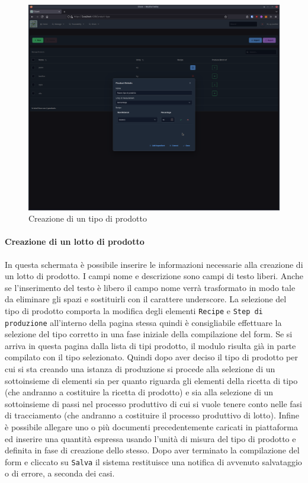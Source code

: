 \documentclass[a4paper,11pt]{article}
\begin{document}
\begin{figure}[H]
  \centering
  \includegraphics[width=0.5\linewidth]{screenIotChain/0009.png}
  \caption{Creazione di un tipo di prodotto}
  \label{fig:screen9}
\end{figure}
\paragraph{Creazione di un lotto di prodotto} In questa schermata è possibile inserire le informazioni necessarie alla creazione di un lotto di prodotto. I campi nome e descrizione sono campi di testo liberi. Anche se l'inserimento del testo è libero il campo nome verrà trasformato in modo tale da eliminare gli spazi e sostituirli con il carattere underscore. La selezione del tipo di prodotto comporta la modifica degli elementi \texttt{Recipe} e \texttt{Step di produzione} all'interno della pagina stessa quindi è consigliabile effettuare la selezione del tipo corretto in una fase iniziale della compilazione del form. Se si arriva in questa pagina dalla lista di tipi prodotto, il modulo risulta già in parte compilato con il tipo selezionato. Quindi dopo aver deciso il tipo di prodotto per cui si sta creando una istanza di produzione si procede alla selezione di un sottoinsieme di elementi sia per quanto riguarda gli elementi della ricetta di tipo (che andranno a costituire la ricetta di prodotto) e sia alla selezione di un sottoinsieme di passi nel processo produttivo di cui si vuole tenere conto nelle fasi di tracciamento (che andranno a costituire il processo produttivo di lotto). Infine è possibile allegare uno o più documenti precedentemente caricati in piattaforma ed inserire una quantità espressa usando l'unità di misura del tipo di prodotto e definita in fase di creazione dello stesso. Dopo aver terminato la compilazione del form e cliccato su \texttt{Salva} il sistema restituisce una notifica di avvenuto salvataggio o di errore, a seconda dei casi.
\end{document}
